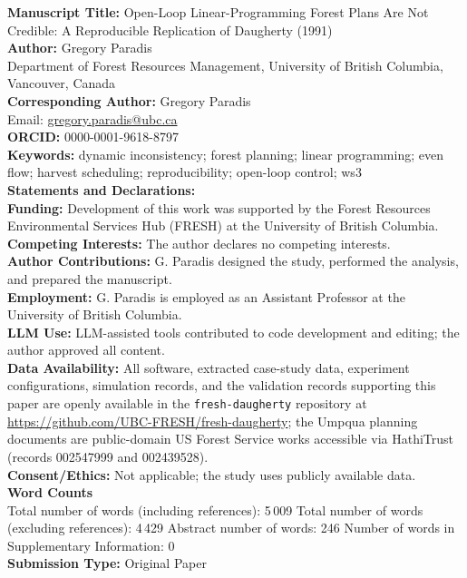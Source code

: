 \documentclass[12pt]{article}
\begin{document}
\thispagestyle{empty}
\doublespacing

\textbf{Manuscript Title:} Open-Loop Linear-Programming Forest Plans Are Not Credible: A Reproducible Replication of Daugherty (1991)\\[1ex]
\textbf{Author:} Gregory Paradis\\
Department of Forest Resources Management, University of British Columbia, Vancouver, Canada\\[1ex]
\textbf{Corresponding Author:} Gregory Paradis\\
Email: \href{mailto:gregory.paradis@ubc.ca}{gregory.paradis@ubc.ca}\\[1ex]
\textbf{ORCID:} 0000-0001-9618-8797\\[1ex]
\textbf{Keywords:} dynamic inconsistency; forest planning; linear programming; even flow; harvest scheduling; reproducibility; open-loop control; ws3\\[1ex]
\textbf{Statements and Declarations:}\\
\textbf{Funding:} Development of this work was supported by the Forest Resources Environmental Services Hub (FRESH) at the University of British Columbia.\\
\textbf{Competing Interests:} The author declares no competing interests.\\
\textbf{Author Contributions:} G. Paradis designed the study, performed the analysis, and prepared the manuscript.\\
\textbf{Employment:} G. Paradis is employed as an Assistant Professor at the University of British Columbia.\\
\textbf{LLM Use:} LLM-assisted tools contributed to code development and editing; the author approved all content.\\
\textbf{Data Availability:} All software, extracted case-study data, experiment configurations, simulation records, and the validation records supporting this paper are openly available in the \texttt{fresh-daugherty} repository at \url{https://github.com/UBC-FRESH/fresh-daugherty}; the Umpqua planning documents are public-domain US Forest Service works accessible via HathiTrust (records 002547999 and 002439528).\\
\textbf{Consent/Ethics:} Not applicable; the study uses publicly available data.\\[1ex]
\textbf{Word Counts}\\
Total number of words (including references): 5\,009
Total number of words (excluding references): 4\,429
Abstract number of words: 246
Number of words in Supplementary Information: 0\\[1ex]
\textbf{Submission Type:} Original Paper\\
\end{document}
